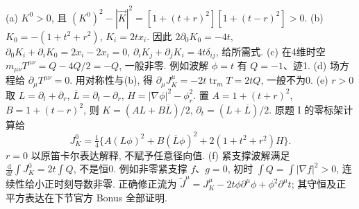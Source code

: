 \begin{solution}
(a) $K^0>0$, 且 $(K^0)^2-|\vec K|^2=[1+(t+r)^2][1+(t-r)^2]>0$.
(b) $K_0=-(1+t^2+r^2)$, $K_i=2tx_i$. 因此 $2\partial_0K_0=-4t$, $\partial_0K_i+\partial_iK_0=2x_i-2x_i=0$, $\partial_iK_j+\partial_jK_i=4t\delta_{ij}$, 给所需式.
(c) 在4维时空 $m_{\mu\nu}T^{\mu\nu}=Q-4Q/2=-Q$, 一般非零. 例如波解 $\phi=t$ 有 $Q=-1$、迹1.
(d) 场方程给 $\partial_\mu T^{\mu\nu}=0$. 用对称性与(b), 得 $\partial_\mu J_K^\mu=-2t\operatorname{tr}_mT=2tQ$, 一般不为0.
(e) $r>0$ 取 $L=\partial_t+\partial_r$, $\overline L=\partial_t-\partial_r$, $H=|\nabla\phi|^2-\phi_r^2$. 置 $A=1+(t+r)^2$, $B=1+(t-r)^2$, 则 $K=(AL+B\overline L)/2$, $\partial_t=(L+\overline L)/2$. 原题 I 的零标架计算给
\[
J_K^0=\tfrac14\{A(L\phi)^2+B(\overline L\phi)^2+2(1+t^2+r^2)H\}.
\]
$r=0$ 以原笛卡尔表达解释, 不赋予任意径向值.
(f) 紧支撑波解满足 $\frac{\mathrm d}{\mathrm dt}\int J_K^0=2t\int Q$, 不是恒0. 例如非零紧支撑 $f$、$g=0$, 初时 $\int Q=\int|\nabla f|^2>0$, 连续性给小正时刻导数非零. 正确修正流为 $\widetilde J^\mu=J_K^\mu-2t\phi\partial^\mu\phi+\phi^2\partial^\mu t$; 其守恒及正平方表达在下节官方 Bonus 全部证明.
\end{solution}
